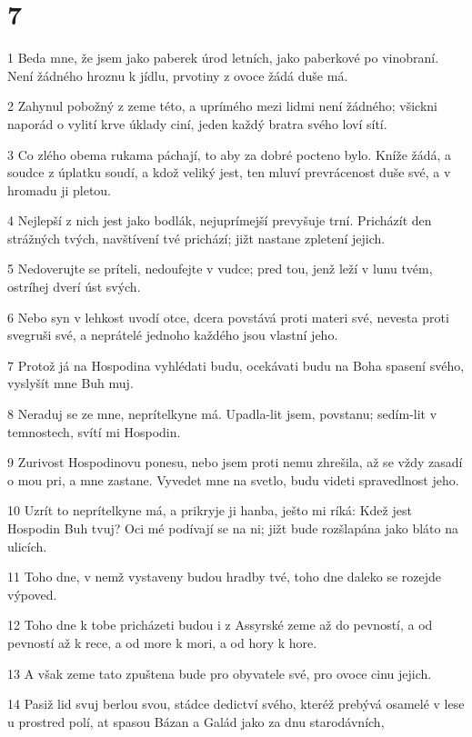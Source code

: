 \chapter{7}

\par 1 Beda mne, že jsem jako paberek úrod letních, jako paberkové po vinobraní. Není žádného hroznu k jídlu, prvotiny z ovoce žádá duše má.
\par 2 Zahynul pobožný z zeme této, a uprímého mezi lidmi není žádného; všickni naporád o vylití krve úklady ciní, jeden každý bratra svého loví sítí.
\par 3 Co zlého obema rukama páchají, to aby za dobré pocteno bylo. Kníže žádá, a soudce z úplatku soudí, a kdož veliký jest, ten mluví prevrácenost duše své, a v hromadu ji pletou.
\par 4 Nejlepší z nich jest jako bodlák, nejuprímejší prevyšuje trní. Pricházít den strážných tvých, navštívení tvé prichází; jižt nastane zpletení jejich.
\par 5 Nedoverujte se príteli, nedoufejte v vudce; pred tou, jenž leží v lunu tvém, ostríhej dverí úst svých.
\par 6 Nebo syn v lehkost uvodí otce, dcera povstává proti materi své, nevesta proti svegruši své, a neprátelé jednoho každého jsou vlastní jeho.
\par 7 Protož já na Hospodina vyhlédati budu, ocekávati budu na Boha spasení svého, vyslyšít mne Buh muj.
\par 8 Neraduj se ze mne, neprítelkyne má. Upadla-lit jsem, povstanu; sedím-lit v temnostech, svítí mi Hospodin.
\par 9 Zurivost Hospodinovu ponesu, nebo jsem proti nemu zhrešila, až se vždy zasadí o mou pri, a mne zastane. Vyvedet mne na svetlo, budu videti spravedlnost jeho.
\par 10 Uzrít to neprítelkyne má, a prikryje ji hanba, ješto mi ríká: Kdež jest Hospodin Buh tvuj? Oci mé podívají se na ni; jižt bude rozšlapána jako bláto na ulicích.
\par 11 Toho dne, v nemž vystaveny budou hradby tvé, toho dne daleko se rozejde výpoved.
\par 12 Toho dne k tobe pricházeti budou i z Assyrské zeme až do pevností, a od pevností až k rece, a od more k mori, a od hory k hore.
\par 13 A však zeme tato zpuštena bude pro obyvatele své, pro ovoce cinu jejich.
\par 14 Pasiž lid svuj berlou svou, stádce dedictví svého, kteréž prebývá osamelé v lese u prostred polí, at spasou Bázan a Galád jako za dnu starodávních,
